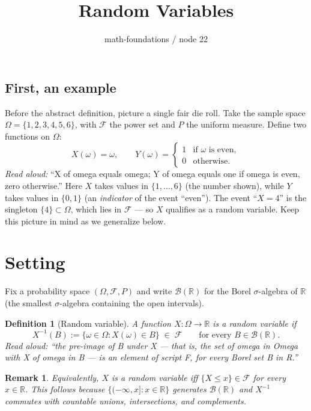 \documentclass[11pt]{article}
\title{Random Variables}
\author{math-foundations / node 22}
\date{}
\newtheorem{definition}[theorem]{Definition}
\newtheorem{remark}[theorem]{Remark}
\begin{document}
\maketitle

\subsection*{First, an example}

Before the abstract definition, picture a single fair die roll. Take the
sample space $\Omega = \{1, 2, 3, 4, 5, 6\}$, with $\mathcal{F}$ the power
set and $P$ the uniform measure. Define two functions on $\Omega$:
\[
   X(\omega) = \omega, \qquad
   Y(\omega) = \begin{cases} 1 & \text{if } \omega \text{ is even}, \\ 0 & \text{otherwise}. \end{cases}
\]
\emph{Read aloud:} ``X of omega equals omega; Y of omega equals one if omega is even, zero otherwise.''
Here $X$ takes values in $\{1, \dots, 6\}$ (the number shown), while $Y$
takes values in $\{0, 1\}$ (an \emph{indicator} of the event ``even''). The
event ``$X = 4$'' is the singleton $\{4\} \subset \Omega$, which lies in
$\mathcal{F}$ --- so $X$ qualifies as a random variable. Keep this picture
in mind as we generalize below.

\section{Setting}

Fix a probability space $(\Omega, \mathcal{F}, P)$ and write $\mathcal{B}(\mathbb{R})$ for the Borel
$\sigma$-algebra of $\mathbb{R}$ (the smallest $\sigma$-algebra containing the open intervals).

\begin{definition}[Random variable]
A function $X : \Omega \to \mathbb{R}$ is a \emph{random variable} if
\[
   X^{-1}(B) := \{\omega \in \Omega : X(\omega) \in B\} \;\in\; \mathcal{F}
   \qquad \text{for every } B \in \mathcal{B}(\mathbb{R}).
\]
\emph{Read aloud:} ``the pre-image of B under X --- that is, the set of omega in Omega with X of omega in B --- is an element of script F, for every Borel set B in R.''
\end{definition}

\begin{remark}
Equivalently, $X$ is a random variable iff $\{X \le x\} \in \mathcal{F}$ for every $x \in \mathbb{R}$.
This follows because $\{(-\infty, x] : x \in \mathbb{R}\}$ generates $\mathcal{B}(\mathbb{R})$ and
$X^{-1}$ commutes with countable unions, intersections, and complements.
\end{remark}
\end{document}
